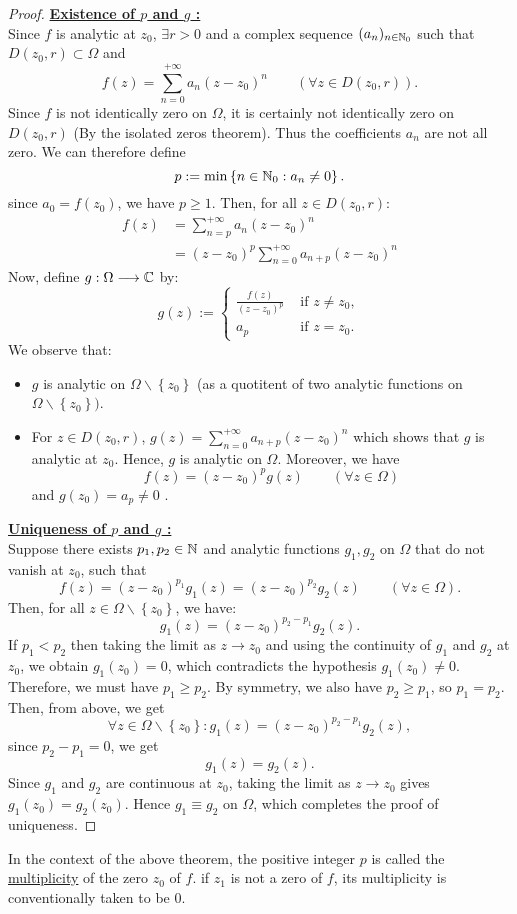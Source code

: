 \begin{proof}
\underline{ \textbf{Existence of $p$ and $g$ :}} \\
Since $f$ is analytic at $z_0$, $\exists  r > 0$ and a complex sequence $(a_n ) _{n \in  \mathbb{N}_0}$ such that 
$D(z_0, r ) \subset \Omega$  and 
\[
f(z)  = \sum_{n=0}^{+\infty} a_n (z-z_0) ^n \quad \quad (\forall  z \in   D(z_0, r) ).
\]
Since $f$ is not identically zero on $\Omega$, it is certainly not identically zero on $D(z_0, r)$ (By the isolated zeros 
theorem). Thus the coefficients $a_n $ are not all zero. We can therefore define 
\[
p := \min \left\{ n \in  \mathbb{N}_0: a_n  \neq 0 \right\}.
\]
since $a_0 = f(z_0) $, we have $p \geq 1$. Then, for all $z \in D(z_0, r)$: 
\begin{align*}
  f(z)  &= \sum_{n=p}^{+\infty} a_n (z-z_0) ^n   \\
        &= (z-z_0) ^{p} \sum_{n=0}^{+\infty} a_{n+p} (z-z_0) ^n 
\end{align*}
Now, define $ g : \Omega \longrightarrow \mathbb{C}  $ by: 
\[
g(z)  := 
\begin{cases}
  \frac{f(z) }{(z-z_0) ^{p}} & \text{ if }  z \neq  z_0,\\
  a_{p} & \text{ if }  z = z_0.
\end{cases}
\]
We observe that:
\begin{itemize}
  \item $g$ is analytic on $\Omega \backslash  \left\{ z_0 \right\}$ (as a quotitent of two 
    analytic functions on $\Omega \backslash  \left\{ z_0 \right\})$.  
    \item For $z \in   D(z_0, r) $, $g(z) = \sum_{n=0}^{+\infty} a_{n+p}(z-z_0) ^n $ which shows that $g$ 
      is analytic at $z_0$. Hence, $g$ is analytic on $\Omega$. Moreover, we have 
      \[
      f(z)  = (z-z_0) ^{p} g(z)  \quad \quad (\forall  z \in   \Omega) 
      \]
      and $g(z_0)  = a_{p} \neq 0 $ .
\end{itemize}
\underline{ \textbf{Uniqueness of $p$ and $g$ :}} \\
Suppose there exists $p_1, p_2 \in  \mathbb{N}$ and analytic functions $g_1, g_2 $ on $\Omega$ that do not vanish 
at $z_0$, such that 
\[
f(z)  = (z-z_0) ^{p_1} g_1(z) = (z-z_0) ^{p_2}  g_2(z)   \quad \quad 
(\forall  z \in   \Omega) .
\]
Then, for all $z \in   \Omega \backslash  \left\{ z_0 \right\}$, we have: 
\[
g_1(z)  = 
(z-z_0) ^{p_2 - p_1} g_2(z) .
\]
If $p_1 <  p_2$ then taking the limit as $z \rightarrow z_0$ and using the continuity of $g_1$ and $g_2$ at $z_0$, 
we obtain $g_1(z_0)  = 0$, which contradicts the hypothesis $g_1(z_0)  \neq 0$. Therefore, we must have 
$p_1 \geq p_2$. By symmetry, we also have $p_2 \geq p_1$, so $p_1 = p_2$. Then, from above, we get 
\[
  \forall z \in   \Omega \backslash  \left\{ z_0 \right\}: 
  g_1(z)  = (z-z_0) ^{p_2-p_1} g_2(z),
\]
since $p_2 - p_1 = 0$, we get
\[
g_1(z) = g_2(z).
\]
Since $g_1$ and $g_2$ are continuous at $z_0$, taking the limit as $z \rightarrow z_0$ gives 
$g_1(z_0)  = g_2(z_0) $. Hence $g_1 \equiv g_2$  on $\Omega$, which completes the proof of uniqueness.
\end{proof}
\begin{definition}[]
In the context of the above theorem, the positive integer $p$ is called the 
\underline{multiplicity} of the zero $z_0$ of $f$. if $z_1$ is not a zero of $f$, its multiplicity 
is conventionally taken to be $0$.
\end{definition}

